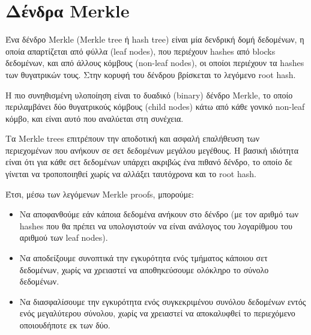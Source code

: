 \section{Δένδρα Merkle}

Ένα δένδρο Merkle (Merkle tree ή hash tree) είναι μία δενδρική δομή δεδομένων, η οποία απαρτίζεται από φύλλα (leaf nodes), που περιέχουν hashes από blocks δεδομένων, και από άλλους κόμβους (non-leaf nodes), οι οποίοι περιέχουν τα hashes των θυγατρικών τους. Στην κορυφή του δένδρου βρίσκεται το λεγόμενο root hash\cite{2.3-merkle-tree}.

Η πιο συνηθισμένη υλοποίηση είναι το δυαδικό (binary) δένδρο Merkle, το οποίο περιλαμβάνει δύο θυγατρικούς κόμβους (child nodes) κάτω από κάθε γονικό non-leaf κόμβο, και είναι αυτό που αναλύεται στη συνέχεια.


Τα Merkle trees επιτρέπουν την αποδοτική και ασφαλή επαλήθευση των περιεχομένων που ανήκουν σε σετ δεδομένων μεγάλου μεγέθους. Η βασική ιδιότητα είναι ότι για κάθε σετ δεδομένων υπάρχει ακριβώς ένα πιθανό δένδρο, το οποίο δε γίνεται να τροποποιηθεί χωρίς να αλλάξει ταυτόχρονα και το root hash. 

Έτσι, μέσω των λεγόμενων Merkle proofs, μπορούμε:
\begin{itemize}
	\item Να αποφανθούμε εάν κάποια δεδομένα ανήκουν στο δένδρο (με τον αριθμό των hashes που θα πρέπει να υπολογιστούν να είναι ανάλογος του λογαρίθμου του αριθμού των leaf nodes).
	\item Να αποδείξουμε συνοπτικά την εγκυρότητα ενός τμήματος κάποιου σετ δεδομένων, χωρίς να χρειαστεί να αποθηκεύσουμε ολόκληρο το σύνολο δεδομένων.
	\item Να διασφαλίσουμε την εγκυρότητα ενός συγκεκριμένου συνόλου δεδομένων εντός ενός μεγαλύτερου σύνολου, χωρίς να χρειαστεί να αποκαλυφθεί το περιεχόμενο οποιουδήποτε εκ των δύο\cite{2.3-merkle-proofs-explained}. 
\end{itemize}

